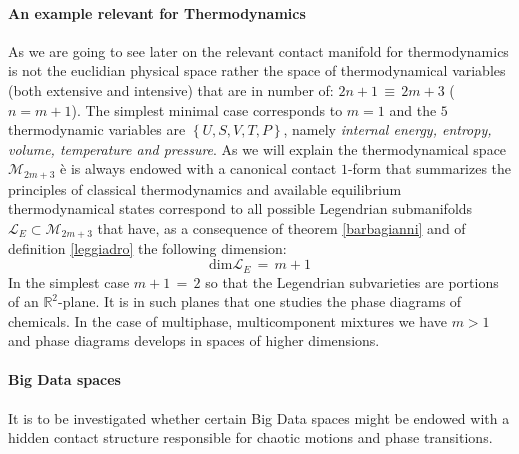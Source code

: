 \documentclass[10pt,a4paper]{article}
\begin{document}
\paragraph{\sc An example relevant for Thermodynamics}
As we are going to see later on the relevant contact manifold for thermodynamics is not the euclidian
physical space rather the space of thermodynamical variables (both extensive and intensive)
that are in number of: $2n+1\, \equiv \, 2m+3$
($n=m+1$).
The simplest minimal case corresponds to $m=1$
and the $5$ thermodynamic variables are
$\left\{U,S,V,T,P\right\}$, namely \textit{ internal energy, entropy,
volume, temperature and pressure}. As we will explain the thermodynamical space
 $\mathcal{M}_{2m+3}$ \`{e} is always endowed with a canonical contact $1$-form that summarizes
the principles of classical thermodynamics
and available equilibrium thermodynamical states
correspond to all possible Legendrian submanifolds
$\mathcal{L}_{E} \subset \mathcal{M}_{2m+3}$ that have, as a consequence of theorem
\ref{barbagianni} and of definition  \ref{leggiadro}
the following dimension:
\begin{equation}\label{dimlegendro}
    \mathrm{dim}\mathcal{L}_{E}\, = \, m+1
\end{equation}
In the simplest case $m+1 \, = \,2$  so that the Legendrian subvarieties are portions of an $\mathbb{R}^2$-plane.
It is in such planes that one studies the phase diagrams of chemicals. In the case of multiphase, multicomponent mixtures we have  $m>1$ and phase diagrams develops in spaces of higher dimensions.
\paragraph{\sc Big Data spaces}
It is to be investigated whether certain Big Data spaces might be endowed with a hidden contact structure responsible for chaotic motions and phase transitions.
\end{document}
